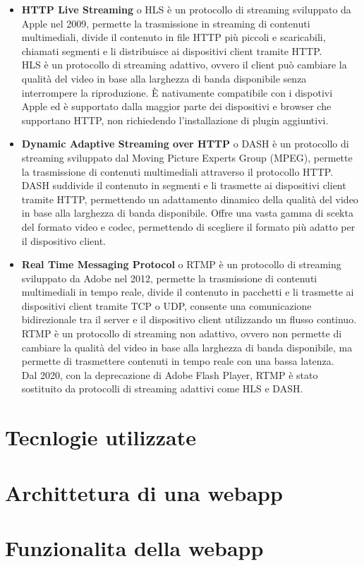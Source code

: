 \begin{itemize}

    \item \textbf{HTTP Live Streaming} o HLS è un protocollo di streaming sviluppato da Apple nel 2009, permette la trasmissione in streaming di contenuti multimediali,
    divide il contenuto in file HTTP più piccoli e scaricabili, chiamati segmenti e li distribuisce ai dispositivi client tramite HTTP.\\
    HLS è un protocollo di streaming adattivo, ovvero il client può cambiare la qualità del video in base alla larghezza di banda disponibile senza interrompere la riproduzione.
    È nativamente compatibile con i dispotivi Apple ed è supportato dalla maggior parte dei dispositivi e browser che supportano HTTP, non richiedendo l'installazione di plugin aggiuntivi.\\

    \item \textbf{Dynamic Adaptive Streaming over HTTP} o DASH è un protocollo di streaming sviluppato dal Moving Picture Experts Group (MPEG), permette la trasmissione di contenuti multimediali
    attraverso il protocollo HTTP.\\
    DASH suddivide il contenuto in segmenti e li trasmette ai dispositivi client tramite HTTP, permettendo un adattamento dinamico della qualità del video in base alla larghezza di banda disponibile.
    Offre una vasta gamma di scekta del formato video e codec, permettendo di scegliere il formato più adatto per il dispositivo client.\\

    \item \textbf{Real Time Messaging Protocol} o RTMP è un protocollo di streaming sviluppato da Adobe nel 2012, permette la trasmissione di contenuti multimediali in tempo reale,
    divide il contenuto in pacchetti e li trasmette ai dispositivi client tramite TCP o UDP, consente una comunicazione bidirezionale tra il server e il dispositivo client utilizzando un flusso continuo.\\
    RTMP è un protocollo di streaming non adattivo, ovvero non permette di cambiare la qualità del video in base alla larghezza di banda disponibile, ma permette di 
    trasmettere contenuti in tempo reale con una bassa latenza.\\
    Dal 2020, con la deprecazione di Adobe Flash Player, RTMP è stato sostituito da protocolli di streaming adattivi come HLS e DASH.\\



    \end{itemize}


\section{Tecnlogie utilizzate}

\section{Archittetura di una webapp}

\section{Funzionalita della webapp}